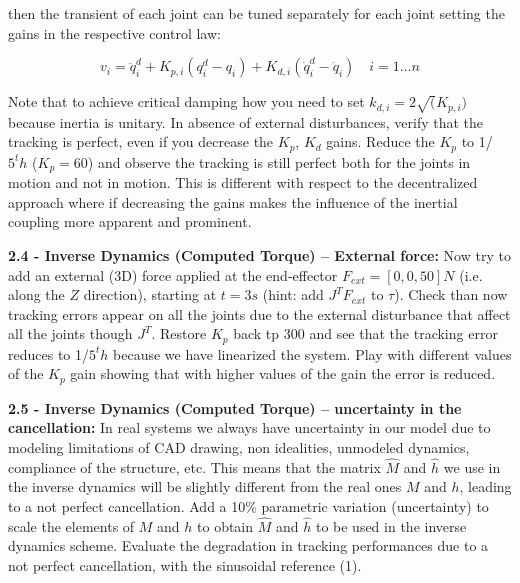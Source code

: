 \documentclass[11pt]{article}
\begin{document}
then the transient of each joint can be tuned separately for each joint setting the gains in the respective  control law:

\begin{equation*}
v_i  = \ddot{q}^d_i + K_{p,i} (q^d_i  - q_i) + K_{d,i} (\dot{q}^d_i  - \dot{q}_i) \quad i = 1 \dots n
\end{equation*}

Note that to achieve critical damping how you need to set $k_{d,i} = 2\sqrt(K_{p,i})$ because inertia is unitary.
In absence of external disturbances, verify that the tracking is perfect, 
even if you decrease the $K_p$, $K_d$ gains.  Reduce the $K_p$ to 1/$5^th$ ($K_p = 60$) and observe the tracking is still perfect both for the joints in motion and not in motion. This is different with respect to the decentralized approach where if decreasing the gains makes the influence of the inertial coupling more apparent and prominent.   

\quad

\noindent
\textbf{2.4 - Inverse Dynamics (Computed Torque) – External force:} 
Now try to add an external (3D) force applied at the end-effector $F_{ext} =[0,0,50] N$ (i.e. along the $Z$ direction),
starting at $t= 3s$ (hint: add  $J^TF_{ext}$ to $\tau$). Check than now tracking errors appear on all the joints due to the external disturbance that affect all the joints though  $J^T$.
Restore $K_p$ back tp $300$ and see that the tracking error reduces to 1/$5^th$ because we have linearized the system. 
Play with different values of the  $K_p$ gain showing that with higher values of the gain the error is reduced.

\quad

\noindent
\textbf{2.5 - Inverse Dynamics (Computed Torque) – uncertainty in the cancellation:}
%
In real systems we always have uncertainty in our model due to modeling 
limitations of  CAD  drawing, non idealities, unmodeled dynamics, compliance of the structure, etc.
This means that the matrix $\hat{M}$ and $\hat{h}$ we use in the inverse dynamics will be slightly different from the real ones ${M}$ and ${h}$, leading to a not perfect cancellation. Add a 10\%   parametric variation (uncertainty) to scale the elements of $M$ and $h$  to obtain $\hat{M}$ and $\hat{h}$  to be used in the inverse dynamics scheme. %
Evaluate the degradation in tracking performances due to a not perfect cancellation, with the sinusoidal reference (1).
\end{document}
